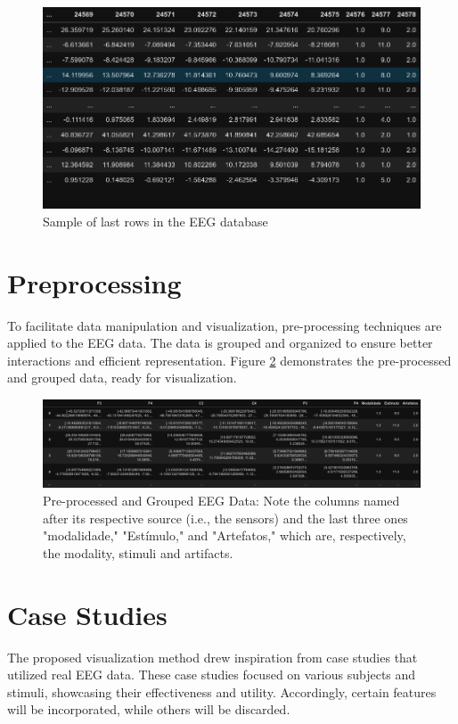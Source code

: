 \documentclass[format=sigconf]{acmart}
\begin{document}
		\begin{figure}[h]
			\centering
			\includegraphics[width=.9\linewidth]{../presentation/images/visu05}
			\caption{Sample of last rows in the EEG database}
			\label{fig:visu05}
		\end{figure}
	
	\section{Preprocessing}
		\par To facilitate data manipulation and visualization, pre-processing techniques are applied to the EEG data. The data is grouped and organized to ensure better interactions and efficient representation. Figure \ref{fig:visu06} demonstrates the pre-processed and grouped data, ready for visualization.
	
		\begin{figure}[h]
			\centering
			\includegraphics[width=\linewidth]{../presentation/images/visu06}
			\caption{Pre-processed and Grouped EEG Data: Note the columns named after its respective source (i.e., the sensors) and the last three ones "modalidade," "Estímulo," and "Artefatos," which are, respectively, the modality, stimuli and artifacts.}
			\label{fig:visu06}
		\end{figure}
	
	\section{Case Studies}
		\par The proposed visualization method drew inspiration from case studies that utilized real EEG data. These case studies focused on various subjects and stimuli, showcasing their effectiveness and utility. Accordingly, certain features will be incorporated, while others will be discarded.
	
\end{document}
